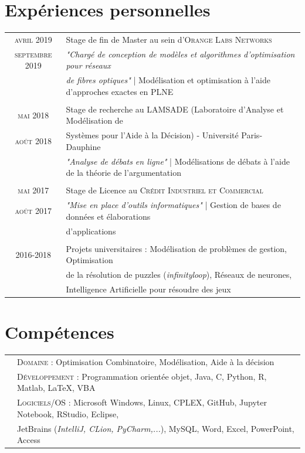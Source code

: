 \documentclass[a4paper,10pt]{article}
\begin{document}
\section{Expériences personnelles}
\begin{tabular}{c|l}	
 \textsc{avril} 2019 & Stage de fin de Master au sein d’\textsc{Orange Labs Networks} \\ 
 \textsc{septembre} 2019 & \emph{"Chargé de conception de modèles et algorithmes d'optimisation pour réseaux}\\
 & \emph{de fibres optiques"}\small{ | Modélisation et optimisation à l'aide d'approches exactes en PLNE}\\\multicolumn{2}{c}{} \\
 \textsc{mai} 2018 & Stage de recherche au \textsc{LAMSADE} (Laboratoire d'Analyse et Modélisation de\\  \textsc{août} 2018 & Systèmes pour l'Aide à la Décision) - Université Paris-Dauphine\\
  & \emph{"Analyse de débats en ligne"}\small{ | Modélisations de débats à l'aide de la théorie de l'argumentation}\\\multicolumn{2}{c}{} \\
 \textsc{mai} 2017 & Stage de Licence au \textsc{Crédit Industriel et Commercial}\\
 \textsc{août} 2017 & \emph{"Mise en place d'outils informatiques"}\small{ | Gestion de bases de données et élaborations} \\ &  \small{d'applications}\\\multicolumn{2}{c}{} \\
 2016-2018 & Projets universitaires : Modélisation de problèmes de gestion, Optimisation\\ & de la résolution de puzzles (\emph{infinityloop}), Réseaux de neurones,\\ & Intelligence Artificielle pour résoudre des jeux
\end{tabular}

\section{Compétences}
\begin{flushleft}
\begin{tabular}{p{0.1cm}l}	
&\textsc{Domaine :}       Optimisation Combinatoire, Modélisation, Aide à la décision\\
&\textsc{Développement :} Programmation orientée objet, Java, C, Python, R, Matlab, \LaTeX, VBA\\
&\textsc{Logiciels/OS :}  Microsoft Windows, Linux, CPLEX, GitHub, Jupyter Notebook, RStudio, Eclipse, \\
&                         JetBrains (\emph{IntelliJ, CLion, PyCharm,...}), MySQL, Word, Excel, PowerPoint, Access
\end{tabular}
\end{flushleft}
\end{document}
